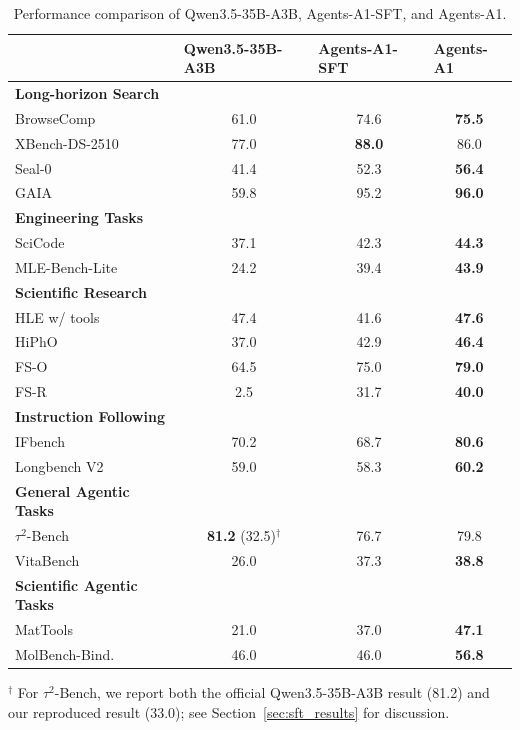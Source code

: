 \documentclass{llmxive}
\providecommand{\ProjectName}{Agents-A1}
\begin{document}
\begin{table}[]
    \centering
    \footnotesize
    \setlength{\tabcolsep}{1.9pt}
    \begin{tabular}{@{}lccc@{}}
    \toprule
    & \multicolumn{1}{l}{\textbf{Qwen3.5-35B-A3B}} & \multicolumn{1}{l}{\textbf{\ProjectName-SFT}} & \multicolumn{1}{l}{\textbf{\ProjectName}} \\
    \midrule
    \textbf{Long-horizon Search} & & & \\
    \midrule
    BrowseComp~\citep{browsecomp} & 61.0 & 74.6 & \textbf{75.5} \\
    XBench-DS-2510~\citep{xbench} & 77.0 & \textbf{88.0} & 86.0 \\
    Seal-0~\citep{sealqa} & 41.4 & 52.3 & \textbf{56.4} \\
    GAIA~\citep{gaia} & 59.8 & 95.2 & \textbf{96.0} \\
    \midrule
    \textbf{Engineering Tasks} & & & \\
    \midrule
    SciCode~\citep{scicode} & 37.1 & 42.3 & \textbf{44.3} \\
    MLE-Bench-Lite~\citep{mlebench} & 24.2 & 39.4 & \textbf{43.9} \\
    \midrule
    \textbf{Scientific Research} & & & \\
    \midrule
    HLE w/ tools~\citep{phan2025humanity} & 47.4 & 41.6 & \textbf{47.6} \\
    HiPhO~\citep{hipho} & 37.0 & 42.9 & \textbf{46.4} \\
    FS-O~\citep{frontierscience} & 64.5 & 75.0 & \textbf{79.0} \\
    FS-R~\citep{frontierscience} & 2.5 & 31.7 & \textbf{40.0} \\
    \midrule
    \textbf{Instruction Following} & & & \\
    \midrule
    IFbench~\citep{IFBench} & 70.2 & 68.7 & \textbf{80.6} \\
    Longbench V2~\citep{LongBench} & 59.0 & 58.3 & \textbf{60.2} \\
    \midrule
    \textbf{General Agentic Tasks} & & & \\
    \midrule
    $\tau^2$-Bench~\citep{barres2025tau2} & \textbf{81.2} (32.5)$^\dag$ & 76.7 & 79.8 \\
    VitaBench~\citep{he2025vitabench} & 26.0 & 37.3 & \textbf{38.8} \\
    \midrule
    \textbf{Scientific Agentic Tasks} & & & \\
    \midrule
    MatTools~\citep{MatTools} & 21.0 & 37.0 & \textbf{47.1} \\
    MolBench-Bind.~\citep{zhang2026molclaw} & 46.0 & 46.0 & \textbf{56.8} \\
    \bottomrule
    \end{tabular}
    
    \vspace{1mm}
    \footnotesize{$^\dag$ For $\tau^2$-Bench, we report both the official Qwen3.5-35B-A3B result (81.2) and our reproduced result (33.0); see Section~\ref{sec:sft_results} for discussion.}
\caption{Performance comparison of Qwen3.5-35B-A3B, \ProjectName-SFT, and \ProjectName.}
\label{tab:sft_opd}
\end{table}
\end{document}
